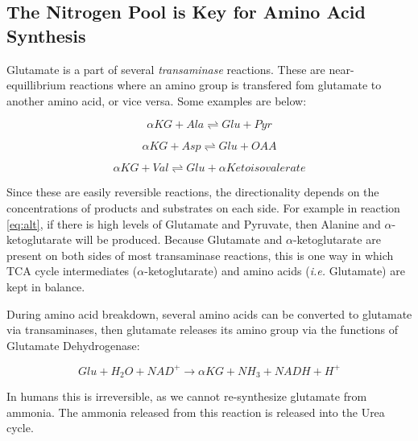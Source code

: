\documentclass{tufte-handout}
\begin{document}
\subsection{The Nitrogen Pool is Key for Amino Acid Synthesis}

Glutamate is a part of several \emph{transaminase} reactions.  These are near-equillibrium reactions where an amino group is transfered fom glutamate to another amino acid, or vice versa.  Some examples are below:

 \begin{equation}\label{eq:alt}
\alpha KG + Ala \rightleftharpoons Glu + Pyr
\end{equation}

 \begin{equation}\label{eq:ast}
\alpha KG + Asp \rightleftharpoons Glu + OAA
\end{equation}

 \begin{equation}
\alpha KG + Val \rightleftharpoons Glu +\alpha Ketoisovalerate
\end{equation}

Since these are easily reversible reactions, the directionality depends on the concentrations of products and substrates on each side.  For example in reaction \ref{eq:alt}, if there is high levels of Glutamate and Pyruvate, then  Alanine and $\alpha$-ketoglutarate will be produced.  Because Glutamate and $\alpha$-ketoglutarate are present on both sides of most transaminase reactions, this is one way in which TCA cycle intermediates ($\alpha$-ketoglutarate) and amino acids (\textit{i.e.} Glutamate) are kept in balance.

  During amino acid breakdown, several amino acids can be converted to glutamate via transaminases, then glutamate releases its amino group via the functions of Glutamate Dehydrogenase:

\begin{equation}\label{eq:GDH}
Glu + H_2O + NAD^+  \rightarrow  \alpha KG + NH_3 + NADH + H^+
\end{equation}

In humans this is irreversible, as we cannot re-synthesize glutamate from ammonia.  The ammonia released from this reaction is released into the Urea cycle.
\end{document}
